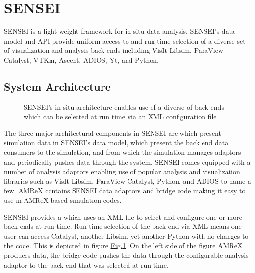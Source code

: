 \documentclass[letterpaper,10pt,english]{sphinxmanual}
\begin{document}
\section{SENSEI}
\label{\detokenize{Visualization:sensei}}
\sphinxAtStartPar
SENSEI is a light weight framework for in situ data analysis. SENSEI’s data
model and API provide uniform access to and run time selection of a diverse set
of visualization and analysis back ends including VisIt Libsim, ParaView
Catalyst, VTK\sphinxhyphen{}m, Ascent, ADIOS, Yt, and Python.


\subsection{System Architecture}
\label{\detokenize{Visualization:system-architecture}}
\begin{figure}[htbp]
\centering
\capstart

\noindent{}
\caption{SENSEI’s in situ architecture enables use of a diverse of back ends which
can be selected at run time via an XML configuration file}\label{\detokenize{Visualization:id10}}\label{\detokenize{Visualization:sensei-arch}}\end{figure}

\sphinxAtStartPar
The three major architectural components in SENSEI are  which
present simulation data in SENSEI’s data model,  which
present the back end data consumers to the simulation, and  from
which the simulation manages adaptors and periodically pushes data through the
system. SENSEI comes equipped with a number of analysis adaptors enabling use
of popular analysis and visualization libraries such as VisIt Libsim, ParaView
Catalyst, Python, and ADIOS to name a few. AMReX contains SENSEI data adaptors
and bridge code making it easy to use in AMReX based simulation codes.

\sphinxAtStartPar
SENSEI provides a  which uses an XML file to
select and configure one or more back ends at run time. Run time selection of
the back end via XML means one user can access Catalyst, another Libsim, yet
another Python with no changes to the code.  This is depicted in figure
\hyperref[\detokenize{Visualization:sensei-arch}]{Fig.\@ \ref{\detokenize{Visualization:sensei-arch}}}. On the left side of the figure AMReX produces data, the
bridge code pushes the data through the configurable analysis adaptor to the
back end that was selected at run time.
\end{document}

